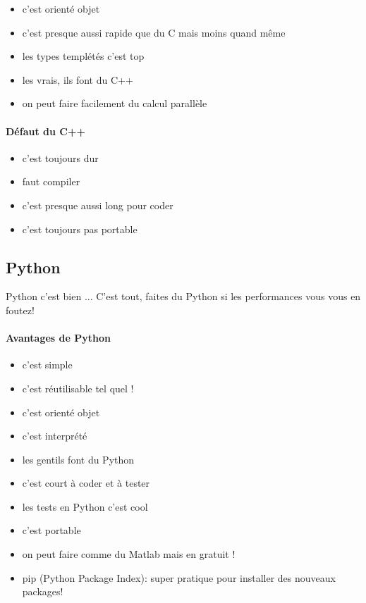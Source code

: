 \documentclass[a4paper,10pt]{book_ad}
\begin{document}
\begin{itemize}
\item c'est orienté objet
\item c'est presque aussi rapide que du C mais moins quand même
\item les types templétés c'est top
\item les vrais, ils font du C++
\item on peut faire facilement du calcul parallèle
\end{itemize}

\paragraph{Défaut du C++}

\begin{itemize}
\item c'est toujours dur
\item faut compiler
\item c'est presque aussi long pour coder
\item c'est toujours pas portable
\end{itemize}

\subsection{Python}

Python c'est bien ... C'est tout, faites du Python si les performances vous vous en foutez!

\paragraph{Avantages de Python}
\begin{itemize}
\item c'est simple
\item c'est réutilisable tel quel ! 
\item c'est orienté objet
\item c'est interprété
\item les gentils font du Python
\item c'est court à coder et à  tester
\item les tests en Python c'est cool
\item c'est portable
\item on peut faire comme du Matlab mais en gratuit !
\item pip (Python Package Index): super pratique pour installer des nouveaux packages!
\end{itemize}
\end{document}
